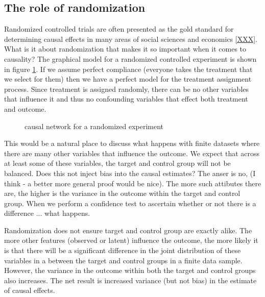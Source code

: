 \documentclass[11pt,a4paper,oneside]{book}
\begin{document}
\subsection*{The role of randomization}
Randomized controlled trials are often presented as the gold standard for determining causal effects in many areas of social sciences and economics \ref{XXX}. What is it about randomization that makes it so important when it comes to causality? The graphical model for a randomized controlled experiment is shown in figure \ref{fig:random_experiment_network}. If we assume perfect compliance (everyone takes the treatment that we select for them) then we have a perfect model for the treatment assignment process. Since treatment is assigned randomly, there can be no other variables that influence it and thus no confounding variables that effect both treatment and outcome. 

\begin{figure}[h]
\caption{causal network for a randomized experiment}
\label{fig:random_experiment_network}
\centering
{}
\end{figure} 

This would be a natural place to discuss what happens with finite datasets where there are many other variables that influence the outcome. We expect that across at least some of these variables, the target and control group will not be balanced. Does this not inject bias into the causal estimates? The anser is no, (I think - a better more general proof would be nice). The more such attibutes there are, the higher is the variance in the outcome within the target and control group. When we perform a confidence test to ascertain whether or not there is a difference ... what happens.

Randomization does not ensure target and control group are exactly alike. The more other features (observed or latent) influence the outcome, the more likely it is that there will be a significant difference in the joint distribution of these variables in a between the target and control groups in a finite data sample. However, the variance in the outcome within both the target and control groups also increases. The net result is increased variance (but not bias) in  the estimate of causal effects. 
\end{document}
